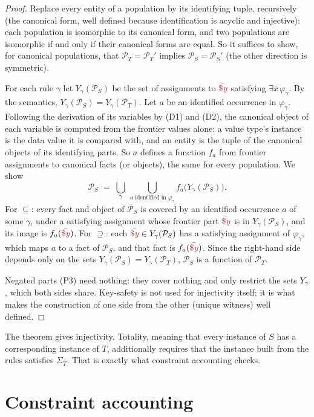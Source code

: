 \documentclass[11pt]{amsart}
\theoremstyle{definition}
\theoremstyle{remark}
\newcommand{\pop}{\mathcal{P}}
\newcommand{\fv}[1]{\textcolor{BrickRed}{\$\mathit{#1}}}
\begin{document}
\begin{proof}
Replace every entity of a population by its identifying tuple,
recursively (the canonical form, well defined because identification is
acyclic and injective): each population is isomorphic to its canonical
form, and two populations are isomorphic if and only if their canonical
forms are equal. So it suffices to show, for canonical populations, that
$\pop_T = \pop_T'$ implies $\pop_S = \pop_S'$ (the other direction is
symmetric).

For each rule $\gamma$ let $Y_\gamma(\pop_S)$ be the set of assignments
to $\bar{\fv{y}}$ satisfying $\exists \bar x\, \varphi_\gamma$. By the
semantics, $Y_\gamma(\pop_S) = Y_\gamma(\pop_T)$. Let $a$ be an identified
occurrence in $\varphi_\gamma$. Following the derivation of its variables
by (D1) and (D2), the canonical object of each variable is computed from
the frontier values alone: a value type's instance is the data value it
is compared with, and an entity is the tuple of the canonical objects of
its identifying parts. So $a$ defines a function $f_a$ from frontier
assignments to canonical facts (or objects), the same for every
population. We show
$$\pop_S \;=\; \bigcup_{\gamma} \ \bigcup_{a \text{ identified in }
  \varphi_\gamma} f_a\big(Y_\gamma(\pop_S)\big).$$
For $\subseteq$: every fact and object of $\pop_S$ is covered by an
identified occurrence $a$ of some $\gamma$, under a satisfying assignment
whose frontier part $\bar{\fv{y}}$ is in $Y_\gamma(\pop_S)$, and its image
is $f_a(\bar{\fv{y}})$. For $\supseteq$: each $\bar{\fv{y}} \in
Y_\gamma(\pop_S)$ has a satisfying assignment of $\varphi_\gamma$, which
maps $a$ to a fact of $\pop_S$, and that fact is $f_a(\bar{\fv{y}})$.
Since the right-hand side depends only on the sets $Y_\gamma(\pop_S) =
Y_\gamma(\pop_T)$, $\pop_S$ is a function of $\pop_T$.

Negated parts (P3) need nothing: they cover nothing and only restrict the
sets $Y_\gamma$, which both sides share. Key-safety is not used for
injectivity itself; it is what makes the construction of one side from the
other (unique witness) well defined.
\end{proof}

The theorem gives injectivity. Totality, meaning that every instance of
$S$ has a corresponding instance of $T$, additionally requires that the
instance built from the rules satisfies $\Sigma_T$. That is exactly what
constraint accounting checks.

\section{Constraint accounting}
\label{sec:accounting}
\end{document}
